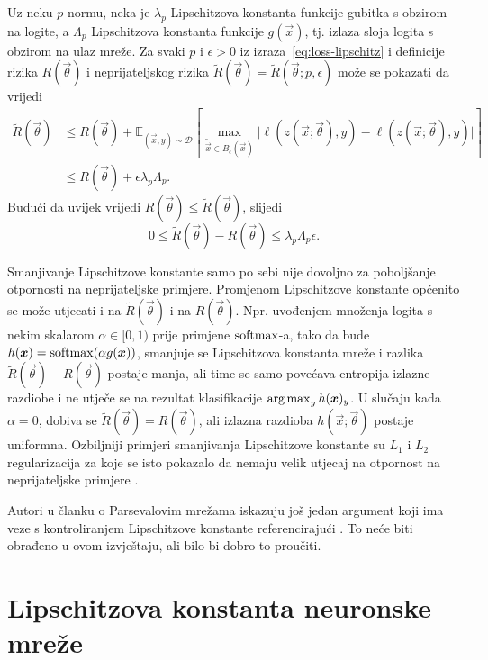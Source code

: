 \documentclass[utf8, seminar, numeric, lmodern]{feri}
\begin{document}
Uz neku $p$-normu, neka je $\lambda_p$ Lipschitzova konstanta funkcije gubitka s obzirom na logite, a $\Lambda_p$ Lipschitzova konstanta funkcije $g(\vec x)$, tj. izlaza sloja logita s obzirom na ulaz mreže. Za svaki $p$ i $\epsilon > 0$  iz izraza~\ref{eq:loss-lipschitz} i definicije rizika $R(\vec\theta)$ i neprijateljskog rizika $\widetilde{R}(\vec\theta)=\widetilde{R}(\vec\theta;p,\epsilon)$ može se pokazati da vrijedi
\begin{align}
\widetilde{R}(\vec\theta) 
&\leq R(\vec\theta) + \mathbb{E}_{(\vec x,y)\sim\mathcal{D}}\left[
\max_{\widetilde{\vec x} \in B_\epsilon(\vec x)} 
\lvert \ell(z(\vec x;\vec\theta),y)-\ell(z(\vec x;\vec\theta),y) \rvert \right] \\
&\leq R(\vec\theta) + \epsilon\lambda_p\Lambda_p.
\end{align}
Budući da uvijek vrijedi $R(\vec\theta) \leq \widetilde{R}(\vec\theta)$, slijedi
\begin{equation}
0 \leq \widetilde{R}(\vec\theta)-R(\vec\theta) \leq \lambda_p\Lambda_p\epsilon.
\end{equation}

Smanjivanje Lipschitzove konstante samo po sebi nije dovoljno za poboljšanje otpornosti na neprijateljske primjere. Promjenom Lipschitzove konstante općenito se može utjecati i na $\widetilde{R}(\vec\theta)$ i na $R(\vec\theta)$. Npr. uvođenjem množenja logita s nekim skalarom $\alpha\in[0,1)$ prije primjene $\operatorname{softmax}$-a, tako da bude $h(\bm{x}) = \operatorname{softmax}(\alpha g(\bm{x}))$, smanjuje se Lipschitzova konstanta mreže i razlika $\widetilde{R}(\vec\theta)-R(\vec\theta)$ postaje manja, ali time se samo povećava entropija izlazne razdiobe i ne utječe se na rezultat klasifikacije $\operatorname*{arg\,max}_yh(\bm{x})_y$. U slučaju kada $\alpha=0$, dobiva se $\widetilde{R}(\vec\theta)=R(\vec\theta)$, ali izlazna razdioba $h(\vec x;\vec\theta)$ postaje uniformna. Ozbiljniji primjeri smanjivanja Lipschitzove konstante su $L_1$ i $L_2$ regularizacija za koje se isto pokazalo da nemaju velik utjecaj na otpornost na neprijateljske primjere \cite{szegedy13-intrig-ipnn,goodfellow14-ehae}. 

Autori u članku o Parsevalovim mrežama iskazuju još jedan argument koji ima veze s kontroliranjem Lipschitzove konstante referencirajući \cite{xu-rg}. To neće biti obrađeno u ovom izvještaju, ali bilo bi dobro to proučiti.

\section{Lipschitzova konstanta neuronske mreže}
\end{document}
